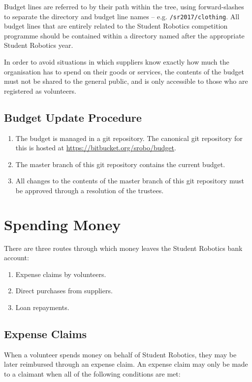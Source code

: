 Budget lines are referred to by their path within the tree, using forward-slashes to separate the directory and budget line names -- e.g. \texttt{/sr2017/clothing}.  All budget lines that are entirely related to the Student Robotics competition programme should be contained within a directory named after the appropriate Student Robotics year.

In order to avoid situations in which suppliers know exactly how much the organisation has to spend on their goods or services, the contents of the budget must not be shared to the general public, and is only accessible to those who are registered as volunteers.

\subsection{Budget Update Procedure}

\begin{enumerate}
\item The budget is managed in a git repository.  The canonical git repository for this is hosted at \url{https://bitbucket.org/srobo/budget}.
\item The master branch of this git repository contains the current budget.
\item All changes to the contents of the master branch of this git repository must be approved through a resolution of the trustees.
\end{enumerate}

\section{Spending Money}

There are three routes through which money leaves the Student Robotics bank account:

\begin{enumerate}
\item Expense claims by volunteers.
\item Direct purchases from suppliers.
\item Loan repayments.
\end{enumerate}

\subsection{Expense Claims}

When a volunteer spends money on behalf of Student Robotics, they may be later reimbursed through an expense claim.  An expense claim may only be made to a claimant when all of the following conditions are met:

